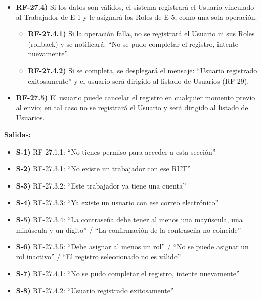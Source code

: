 \begin{itemize}[label={}, leftmargin=1.5em]
\begin{itemize}[label={}, leftmargin=1.5em]
    \item \textbf{RF-27.3.6)} En los casos RF-27.3.1 a RF-27.3.5 no se registrar\'a el Usuario y se retornar\'a al ingreso de datos con los valores anteriores al env\'io, salvo E-3 y E-4, que se vac\'ian.
  \end{itemize}
  \item \textbf{RF-27.4)} Si los datos son v\'alidos, el sistema registrar\'a el Usuario vinculado al Trabajador de E-1 y le asignar\'a los Roles de E-5, como una sola operaci\'on.
  \begin{itemize}[label={}, leftmargin=1.5em]
    \item \textbf{RF-27.4.1)} Si la operaci\'on falla, no se registrar\'a el Usuario ni sus Roles (rollback) y se notificar\'a: ``No se pudo completar el registro, intente nuevamente''.
    \item \textbf{RF-27.4.2)} Si se completa, se desplegar\'a el mensaje: ``Usuario registrado exitosamente'' y el usuario ser\'a dirigido al listado de Usuarios (RF-29).
  \end{itemize}
  \item \textbf{RF-27.5)} El usuario puede cancelar el registro en cualquier momento previo al env\'io; en tal caso no se registrar\'a el Usuario y ser\'a dirigido al listado de Usuarios.
\end{itemize}

\textbf{Salidas:}
\begin{itemize}[label={}, leftmargin=1.5em]
  \item \textbf{S-1)} RF-27.1.1: ``No tienes permiso para acceder a esta secci\'on''
  \item \textbf{S-2)} RF-27.3.1: ``No existe un trabajador con ese RUT''
  \item \textbf{S-3)} RF-27.3.2: ``Este trabajador ya tiene una cuenta''
  \item \textbf{S-4)} RF-27.3.3: ``Ya existe un usuario con ese correo electr\'onico''
  \item \textbf{S-5)} RF-27.3.4: ``La contrase\~na debe tener al menos una may\'uscula, una min\'uscula y un d\'igito'' / ``La confirmaci\'on de la contrase\~na no coincide''
  \item \textbf{S-6)} RF-27.3.5: ``Debe asignar al menos un rol'' / ``No se puede asignar un rol inactivo'' / ``El registro seleccionado no es v\'alido''
  \item \textbf{S-7)} RF-27.4.1: ``No se pudo completar el registro, intente nuevamente''
  \item \textbf{S-8)} RF-27.4.2: ``Usuario registrado exitosamente''
\end{itemize}


